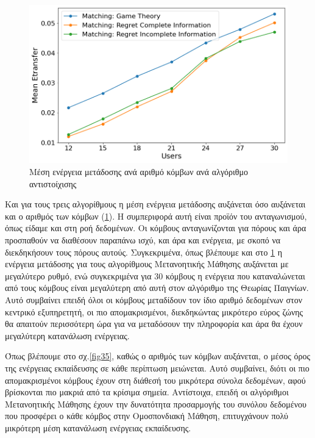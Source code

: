 \begin{figure}[ht]
    \centering
    \includegraphics[width=\textwidth]{figures/chapter4/Mean_Etransfer_vs_Users.png}
    \caption{Μέση ενέργεια μετάδοσης ανά αριθμό κόμβων ανά αλγόριθμο αντιστοίχισης}
    \label{fig34}
\end{figure}

Και για τους τρεις αλγορίθμους η μέση ενέργεια μετάδοσης αυξάνεται όσο αυξάνεται και ο αριθμός των κόμβων (\ref{fig34}). Η συμπεριφορά αυτή είναι προϊόν του ανταγωνισμού, όπως είδαμε και στη ροή δεδομένων. Οι κόμβους ανταγωνίζονται για πόρους και άρα προσπαθούν να διαθέσουν παραπάνω ισχύ, και άρα και ενέργεια, με σκοπό να διεκδηκήσουν τους πόρους αυτούς. Συγκεκριμένα, όπως βλέπουμε και στο \ref{fig34} η ενέργεια μετάδοσης για τους αλγορίθμους Μετανοητικής Μάθησης αυξάνεται με μεγαλύτερο ρυθμό, ενώ συγκεκριμένα για 30 κόμβους η ενέργεια που καταναλώνεται από τους κόμβους είναι μεγαλύτερη από αυτή στον αλγόριθμο της Θεωρίας Παιγνίων. Αυτό συμβαίνει επειδή όλοι οι κόμβους μεταδίδουν τον ίδιο αριθμό δεδομένων στον κεντρικό εξυπηρετητή, οι πιο απομακρισμένοι, διεκδηκώντας μικρότερο εύρος ζώνης θα απαιτούν περισσότερη ώρα για να μεταδόσουν την πληροφορία και άρα θα έχουν μεγαλύτερη κατανάλωση ενέργειας.

Όπως βλέπουμε στο σχ.\ref{fig35}, καθώς ο αριθμός των κόμβων αυξάνεται, ο μέσος όρος της ενέργειας εκπαίδευσης σε κάθε περίπτωση μειώνεται. Αυτό συμβαίνει, διότι οι πιο απομακρισμένοι κόμβους έχουν στη διάθεσή του μικρότερα σύνολα δεδομένων, αφού βρίσκονται πιο μακριά από τα κρίσιμα σημεία. Αντίστοιχα, επειδή οι αλγόριθμοι Μετανοητικής Μάθησης έχουν την δυνατότητα προσαρμογής του συνόλου δεδομένου που προσφέρει ο κάθε κόμβος στην Ομοσπονδιακή Μάθηση, επιτυγχάνουν πολύ μικρότερη μέση κατανάλωση ενέργειας εκπαίδευσης. 

